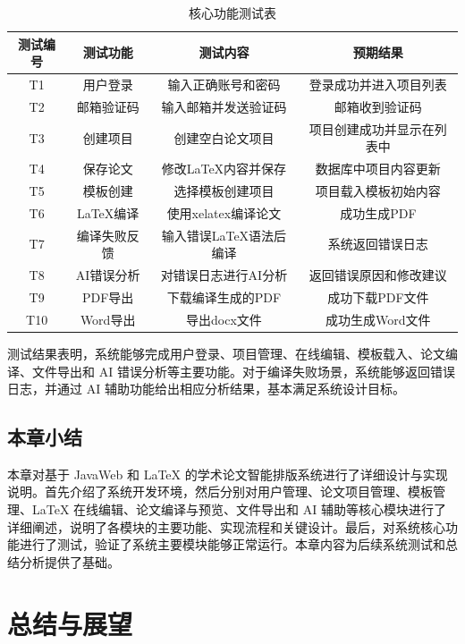 \documentclass{xduugthesis}
\begin{document}
\begin{table}[H]
    \centering
    \caption{核心功能测试表}
    \label{tab:core-function-test}
    \begin{tabular}{|c|c|c|c|}
        \hline
        测试编号 & 测试功能 & 测试内容 & 预期结果 \\
        \hline
        T1 & 用户登录 & 输入正确账号和密码 & 登录成功并进入项目列表 \\
        \hline
        T2 & 邮箱验证码 & 输入邮箱并发送验证码 & 邮箱收到验证码 \\
        \hline
        T3 & 创建项目 & 创建空白论文项目 & 项目创建成功并显示在列表中 \\
        \hline
        T4 & 保存论文 & 修改LaTeX内容并保存 & 数据库中项目内容更新 \\
        \hline
        T5 & 模板创建 & 选择模板创建项目 & 项目载入模板初始内容 \\
        \hline
        T6 & LaTeX编译 & 使用xelatex编译论文 & 成功生成PDF \\
        \hline
        T7 & 编译失败反馈 & 输入错误LaTeX语法后编译 & 系统返回错误日志 \\
        \hline
        T8 & AI错误分析 & 对错误日志进行AI分析 & 返回错误原因和修改建议 \\
        \hline
        T9 & PDF导出 & 下载编译生成的PDF & 成功下载PDF文件 \\
        \hline
        T10 & Word导出 & 导出docx文件 & 成功生成Word文件 \\
        \hline
    \end{tabular}
\end{table}

测试结果表明，系统能够完成用户登录、项目管理、在线编辑、模板载入、论文编译、文件导出和 AI 错误分析等主要功能。对于编译失败场景，系统能够返回错误日志，并通过 AI 辅助功能给出相应分析结果，基本满足系统设计目标。

\section{本章小结}
本章对基于 JavaWeb 和 LaTeX 的学术论文智能排版系统进行了详细设计与实现说明。首先介绍了系统开发环境，然后分别对用户管理、论文项目管理、模板管理、LaTeX 在线编辑、论文编译与预览、文件导出和 AI 辅助等核心模块进行了详细阐述，说明了各模块的主要功能、实现流程和关键设计。最后，对系统核心功能进行了测试，验证了系统主要模块能够正常运行。本章内容为后续系统测试和总结分析提供了基础。

\chapter{总结与展望}
\end{document}
